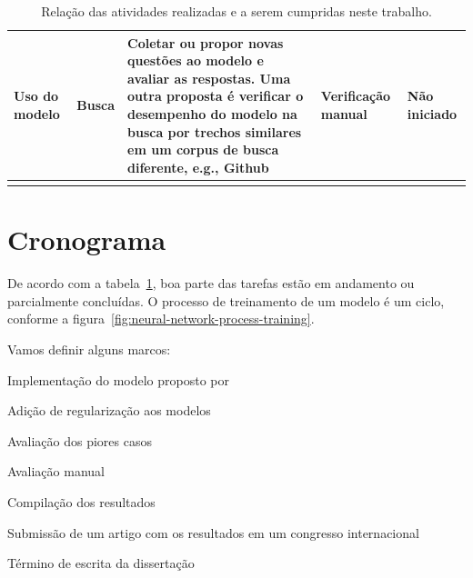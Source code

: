 {\begin{longtable}{ p{8em} p{8em} p{10em} p{8em} p{6em} }
Uso do modelo & Busca & Coletar ou propor novas questões ao modelo e avaliar as respostas. Uma outra proposta é verificar o desempenho do modelo na busca por trechos similares em um corpus de busca diferente, e.g., Github & Verificação manual & Não iniciado \\
\hline

 
\caption{Relação das atividades realizadas e a serem cumpridas neste trabalho.}
\label{table:etapas-processo-treinamento}
\end{longtable}}


\section{Cronograma}

De acordo com a tabela~\ref{table:etapas-processo-treinamento}, boa parte das tarefas estão em andamento ou parcialmente concluídas. O processo de treinamento de um modelo é um ciclo, conforme a figura~\ref{fig:neural-network-process-training}.

Vamos definir alguns marcos:

Implementação do modelo proposto por \cite{cambronero-deep-learning-code-search:2019}

Adição de regularização aos modelos

Avaliação dos piores casos

Avaliação manual

Compilação dos resultados

Submissão de um artigo com os resultados em um congresso internacional

Término de escrita da dissertação










